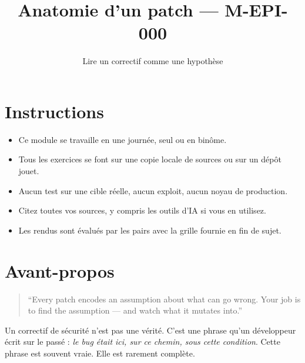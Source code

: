 \documentclass{training}
\begin{document}
\title{Anatomie d'un patch --- M-EPI-000}
\subtitle{Lire un correctif comme une hypothèse}
\maketitle

\newpage
\tableofcontents
\newpage

\chapter{Instructions}
\begin{itemize}
  \item Ce module se travaille en une journée, seul ou en binôme.
  \item Tous les exercices se font sur une copie locale de sources ou sur un dépôt jouet.
  \item Aucun test sur une cible réelle, aucun exploit, aucun noyau de production.
  \item Citez toutes vos sources, y compris les outils d'IA si vous en utilisez.
  \item Les rendus sont évalués par les pairs avec la grille fournie en fin de sujet.
\end{itemize}





\chapter{Avant-propos}

\begin{quote}
``Every patch encodes an assumption about what can go wrong. Your job is to
find the assumption --- and watch what it mutates into.''
\end{quote}

Un correctif de sécurité n'est pas une vérité. C'est une phrase qu'un
développeur écrit sur le passé : \emph{le bug était ici, sur ce chemin, sous
cette condition}. Cette phrase est souvent vraie. Elle est rarement complète.
\end{document}
